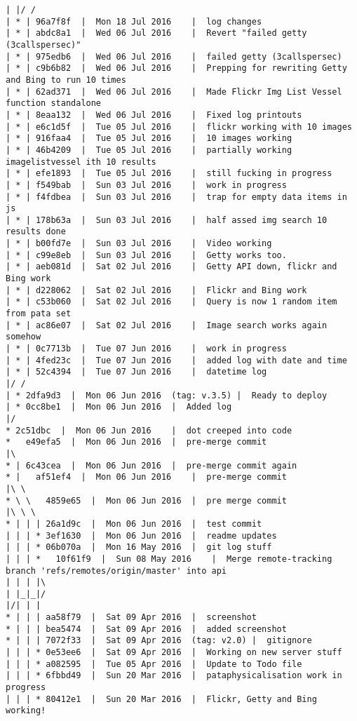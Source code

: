 \begin{verbatim}
| |/ /  
| * | 96a7f8f  |  Mon 18 Jul 2016	 |  log changes
| * | abdc8a1  |  Wed 06 Jul 2016	 |  Revert "failed getty (3callspersec)"
| * | 975edb6  |  Wed 06 Jul 2016	 |  failed getty (3callspersec)
| * | c9b6b82  |  Wed 06 Jul 2016	 |  Prepping for rewriting Getty and Bing to run 10 times
| * | 62ad371  |  Wed 06 Jul 2016	 |  Made Flickr Img List Vessel function standalone
| * | 8eaa132  |  Wed 06 Jul 2016	 |  Fixed log printouts
| * | e6c1d5f  |  Tue 05 Jul 2016	 |  flickr working with 10 images
| * | 916faa4  |  Tue 05 Jul 2016	 |  10 images working
| * | 46b4209  |  Tue 05 Jul 2016	 |  partially working imagelistvessel ith 10 results
| * | efe1893  |  Tue 05 Jul 2016	 |  still fucking in progress
| * | f549bab  |  Sun 03 Jul 2016	 |  work in progress
| * | f4fdbea  |  Sun 03 Jul 2016	 |  trap for empty data items in js
| * | 178b63a  |  Sun 03 Jul 2016	 |  half assed img search 10 results done
| * | b00fd7e  |  Sun 03 Jul 2016	 |  Video working
| * | c99e8eb  |  Sun 03 Jul 2016	 |  Getty works too.
| * | aeb081d  |  Sat 02 Jul 2016	 |  Getty API down, flickr and Bing work
| * | d228062  |  Sat 02 Jul 2016	 |  Flickr and Bing work
| * | c53b060  |  Sat 02 Jul 2016	 |  Query is now 1 random item from pata set
| * | ac86e07  |  Sat 02 Jul 2016	 |  Image search works again somehow
| * | 0c7713b  |  Tue 07 Jun 2016	 |  work in progress
| * | 4fed23c  |  Tue 07 Jun 2016	 |  added log with date and time
| * | 52c4394  |  Tue 07 Jun 2016	 |  datetime log
|/ /  
| * 2dfa9d3  |  Mon 06 Jun 2016	 (tag: v.3.5) |  Ready to deploy
| * 0cc8be1  |  Mon 06 Jun 2016	 |  Added log
|/  
* 2c51dbc  |  Mon 06 Jun 2016	 |  dot creeped into code
*   e49efa5  |  Mon 06 Jun 2016	 |  pre-merge commit
|\  
* | 6c43cea  |  Mon 06 Jun 2016	 |  pre-merge commit again
* |   af51ef4  |  Mon 06 Jun 2016	 |  pre-merge commit
|\ \  
* \ \   4859e65  |  Mon 06 Jun 2016	 |  pre merge commit
|\ \ \  
* | | | 26a1d9c  |  Mon 06 Jun 2016	 |  test commit
| | | * 3ef1630  |  Mon 06 Jun 2016	 |  readme updates
| | | * 06b070a  |  Mon 16 May 2016	 |  git log stuff
| | | *   10f61f9  |  Sun 08 May 2016	 |  Merge remote-tracking branch 'refs/remotes/origin/master' into api
| | | |\  
| |_|_|/  
|/| | |   
* | | | aa58f79  |  Sat 09 Apr 2016	 |  screenshot
* | | | bea5474  |  Sat 09 Apr 2016	 |  added screenshot
* | | | 7072f33  |  Sat 09 Apr 2016	 (tag: v2.0) |  gitignore
| | | * 0e53ee6  |  Sat 09 Apr 2016	 |  Working on new server stuff
| | | * a082595  |  Tue 05 Apr 2016	 |  Update to Todo file
| | | * 6fbbd49  |  Sun 20 Mar 2016	 |  pataphysicalisation work in progress
| | | * 80412e1  |  Sun 20 Mar 2016	 |  Flickr, Getty and Bing working!

\end{verbatim}
